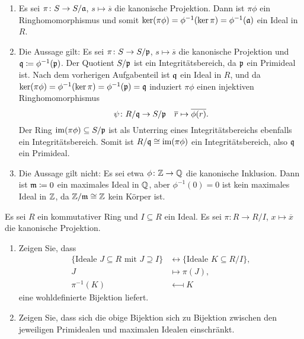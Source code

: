\begin{solution}
  \begin{enumerate}
    \item
      Es sei $\pi \colon S \to S/\mathfrak{a}$, $s \mapsto \overline{s}$ die kanonische Projektion.
      Dann ist $\pi \phi$ ein Ringhomomorphismus und somit $\ker (\pi \phi) = \phi^{-1}(\ker \pi) = \phi^{-1}(\mathfrak{a})$ ein Ideal in $R$.
    \item
      Die Aussage gilt:
      Es sei $\pi \colon S \to S/\mathfrak{p}$, $s \mapsto \overline{s}$ die kanonische Projektion und $\mathfrak{q} \coloneqq \phi^{-1}(\mathfrak{p})$.
      Der Quotient $S/\mathfrak{p}$ ist ein Integritätsbereich, da $\mathfrak{p}$ ein Primideal ist.
      Nach dem vorherigen Aufgabenteil ist $\mathfrak{q}$ ein Ideal in $R$, und da $\ker (\pi \phi) = \phi^{-1}(\ker \pi) = \phi^{-1}(\mathfrak{p}) = \mathfrak{q}$ induziert $\pi \phi$ einen injektiven Ringhomomorphismus
      \[
        \psi \colon R/\mathfrak{q} \to S/\mathfrak{p}
        \quad
        \overline{r} \mapsto \overline{\phi(r)}.
      \]
      Der Ring $\operatorname{im} (\pi \phi) \subseteq S/\mathfrak{p}$ ist als Unterring eines Integritätsbereichs ebenfalls ein Integritätsbereich.
      Somit ist $R/\mathfrak{q} \cong \operatorname{im}(\pi \phi)$ ein Integritätsbereich, also $\mathfrak{q}$ ein Primideal.
    \item
      Die Aussage gilt nicht:
      Es sei etwa $\phi \colon \mathbb{Z} \to \mathbb{Q}$ die kanonische Inklusion.
      Dann ist $\mathfrak{m} \coloneqq 0$ ein maximales Ideal in $\mathbb{Q}$, aber $\phi^{-1}(0) = 0$ ist kein maximales Ideal in $\mathbb{Z}$, da $\mathbb{Z}/\mathfrak{m} \cong \mathbb{Z}$ kein Körper ist.
  \end{enumerate}
\end{solution}


\begin{question}
  \label{question: lattice isomorphism for quotients}
  Es sei $R$ ein kommutativer Ring und $I \subseteq R$ ein Ideal.
  Es sei $\pi \colon R \to R/I$, $x \mapsto \overline{x}$ die kanonische Projektion.
  \begin{enumerate}
    \item
      Zeigen Sie, dass
      \begin{align*}
                              \{ \text{Ideale $J \subseteq R$ mit $J \supseteq I$} \}
        &\longleftrightarrow  \{ \text{Ideale $K \subseteq R/I$} \},
        \\
                      J
        &\longmapsto  \pi(J),
        \\
                        \pi^{-1}(K)
        &\longmapsfrom  K
      \end{align*}
      eine wohldefinierte Bijektion liefert.
    \item
      Zeigen Sie, dass sich die obige Bijektion sich zu Bijektion zwischen den jeweiligen Primidealen und maximalen Idealen einschränkt.
  \end{enumerate}
\end{question}


